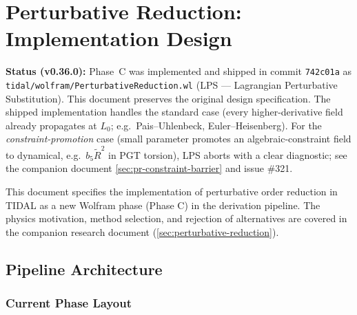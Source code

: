 
\section{Perturbative Reduction: Implementation Design}
\label{sec:prd-design}

\textbf{Status (v0.36.0):} Phase~C was implemented and shipped in commit \texttt{742c01a} as \texttt{tidal/wolfram/PerturbativeReduction.wl} (LPS --- Lagrangian Perturbative Substitution).  This document preserves the original design specification.  The shipped implementation handles the standard case (every higher-derivative field already propagates at $L_0$; e.g.\ Pais--Uhlenbeck, Euler--Heisenberg).  For the \emph{constraint-promotion} case (small parameter promotes an algebraic-constraint field to dynamical, e.g.\ $b_5 \tilde{R}^2$ in PGT torsion), LPS aborts with a clear diagnostic; see the companion document \cref{sec:pr-constraint-barrier} and issue \#321.

This document specifies the implementation of perturbative order reduction in TIDAL as a new Wolfram phase (Phase C) in the derivation pipeline. The physics motivation, method selection, and rejection of alternatives are covered in the companion research document (\cref{sec:perturbative-reduction}).

\subsection{Pipeline Architecture}
\label{sec:prd-architecture}

\subsubsection{Current Phase Layout}


